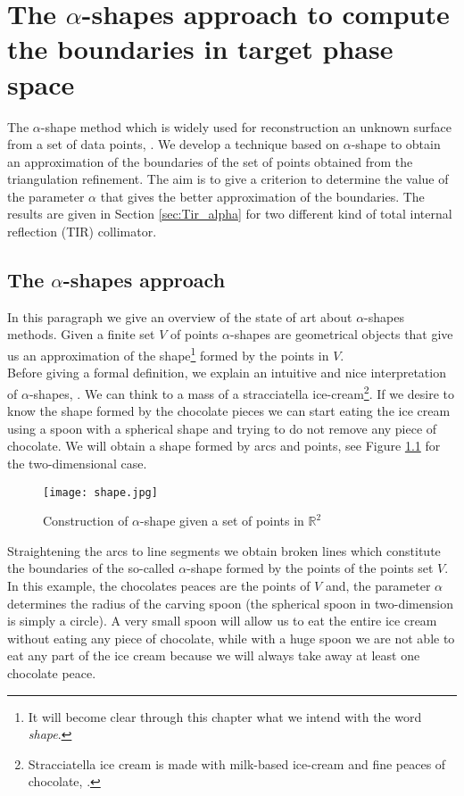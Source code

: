 \chapter{The $\alpha$-shapes approach to compute the boundaries in target phase space}\label{chap:boundaries_alpha}
The $\alpha$-shape method which is widely used for reconstruction an unknown surface from a set of data points, \cite{guo1997surface}.
We develop a technique based on $\alpha$-shape to obtain an approximation of the boundaries of the set of points obtained from the triangulation refinement.
The aim is to give a criterion to determine the value of the parameter $\alpha$ that gives the better approximation of the boundaries.
The results are given in Section \ref{sec:Tir_alpha} for two different kind of total internal reflection (TIR) collimator.
\section{The $\alpha$-shapes approach}
In this paragraph we give an overview of the state of art about $\alpha$-shapes methods.
Given a finite set $V$ of points $\alpha$-shapes are geometrical objects that give us an approximation of the shape\footnote{It will become clear through this chapter what we intend with the word \textit{shape}.} formed by the points in $V$.\\ \indent
Before giving a formal definition, we explain an intuitive and nice interpretation of $\alpha$-shapes, \cite{lucieer2004alpha}. 
We can think to a mass of a stracciatella ice-cream\footnote{Stracciatella ice cream is made with milk-based ice-cream and fine peaces of chocolate, \cite{Wiki3}.}. If we desire to know the shape formed by the chocolate pieces we can start eating the ice cream using a spoon with a spherical shape and trying to do not remove any piece of chocolate. 
We will obtain a shape formed by arcs and points, see Figure \ref{fig:shape2d} for the two-dimensional case.
\begin{figure}[htbp]\label{fig:shape2d}
\begin{center}
\texttt{[image: shape.jpg]}
\label{fig:shape}
\caption{Construction of $\alpha$-shape given a set of points in $\mathbb{R}^2$}
\label{fig:shape2d}
\end{center}
\end{figure}
Straightening the arcs to line segments we obtain broken lines which constitute the boundaries of the so-called $\alpha$-shape formed by the points of the points set $V$. In this example, the chocolates peaces are the points of $V$ and, the parameter $\alpha$ determines the radius of the carving spoon (the spherical spoon in two-dimension is simply a circle). A very small spoon will allow us to eat the entire ice cream without eating any piece of chocolate, while with a huge spoon we are not able to eat any part of the ice cream because we will always take away at least one chocolate peace.\\ \indent 
